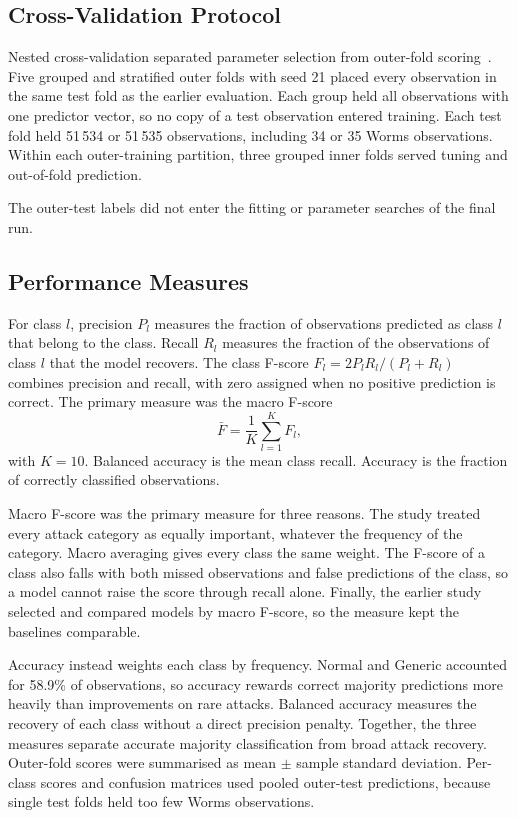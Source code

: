 \documentclass[conference]{IEEEtran}
\begin{document}
\subsection{Cross-Validation Protocol}
Nested cross-validation separated parameter selection from outer-fold scoring~\cite{cawley2010}. Five grouped and stratified outer folds with seed 21 placed every observation in the same test fold as the earlier evaluation. Each group held all observations with one predictor vector, so no copy of a test observation entered training. Each test fold held 51\,534 or 51\,535 observations, including 34 or 35 Worms observations. Within each outer-training partition, three grouped inner folds served tuning and out-of-fold prediction.

The outer-test labels did not enter the fitting or parameter searches of the final run.

\subsection{Performance Measures}
For class $l$, precision $P_l$ measures the fraction of observations predicted as class $l$ that belong to the class. Recall $R_l$ measures the fraction of the observations of class $l$ that the model recovers. The class F-score $F_l=2P_lR_l/(P_l+R_l)$ combines precision and recall, with zero assigned when no positive prediction is correct. The primary measure was the macro F-score
\begin{equation}
    \bar{F}=\frac{1}{K}\sum_{l=1}^{K}F_l,
\end{equation}
with $K=10$. Balanced accuracy is the mean class recall. Accuracy is the fraction of correctly classified observations.

Macro F-score was the primary measure for three reasons. The study treated every attack category as equally important, whatever the frequency of the category. Macro averaging gives every class the same weight. The F-score of a class also falls with both missed observations and false predictions of the class, so a model cannot raise the score through recall alone. Finally, the earlier study selected and compared models by macro F-score, so the measure kept the baselines comparable.

Accuracy instead weights each class by frequency. Normal and Generic accounted for 58.9\% of observations, so accuracy rewards correct majority predictions more heavily than improvements on rare attacks. Balanced accuracy measures the recovery of each class without a direct precision penalty. Together, the three measures separate accurate majority classification from broad attack recovery. Outer-fold scores were summarised as mean $\pm$ sample standard deviation. Per-class scores and confusion matrices used pooled outer-test predictions, because single test folds held too few Worms observations.
\end{document}
